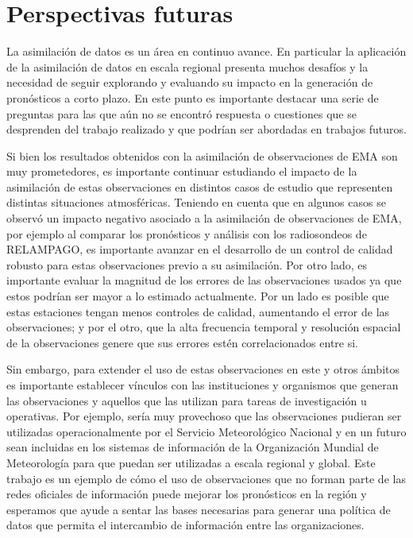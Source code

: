 \documentclass[12pt,oneside,a4paper]{reedthesis}
\begin{document}
\hypertarget{perspectivas-futuras}{%
\section{Perspectivas futuras}\label{perspectivas-futuras}}

La asimilación de datos es un área en continuo avance. En particular la aplicación de la asimilación de datos en escala regional presenta muchos desafíos y la necesidad de seguir explorando y evaluando su impacto en la generación de pronósticos a corto plazo. En este punto es importante destacar una serie de preguntas para las que aún no se encontró respuesta o cuestiones que se desprenden del trabajo realizado y que podrían ser abordadas en trabajos futuros.

Si bien los resultados obtenidos con la asimilación de observaciones de EMA son muy prometedores, es importante continuar estudiando el impacto de la asimilación de estas observaciones en distintos casos de estudio que representen distintas situaciones atmosféricas. Teniendo en cuenta que en algunos casos se observó un impacto negativo asociado a la asimilación de observaciones de EMA, por ejemplo al comparar los pronósticos y análisis con los radiosondeos de RELAMPAGO, es importante avanzar en el desarrollo de un control de calidad robusto para estas observaciones previo a su asimilación. Por otro lado, es importante evaluar la magnitud de los errores de las observaciones usados ya que estos podrían ser mayor a lo estimado actualmente. Por un lado es posible que estas estaciones tengan menos controles de calidad, aumentando el error de las observaciones; y por el otro, que la alta frecuencia temporal y resolución espacial de la observaciones genere que sus errores estén correlacionados entre si.

Sin embargo, para extender el uso de estas observaciones en este y otros ámbitos es importante establecer vínculos con las instituciones y organismos que generan las observaciones y aquellos que las utilizan para tareas de investigación u operativas. Por ejemplo, sería muy provechoso que las observaciones pudieran ser utilizadas operacionalmente por el Servicio Meteorológico Nacional y en un futuro sean incluidas en los sistemas de información de la Organización Mundial de Meteorología para que puedan ser utilizadas a escala regional y global. Este trabajo es un ejemplo de cómo el uso de observaciones que no forman parte de las redes oficiales de información puede mejorar los pronósticos en la región y esperamos que ayude a sentar las bases necesarias para generar una política de datos que permita el intercambio de información entre las organizaciones.
\end{document}
